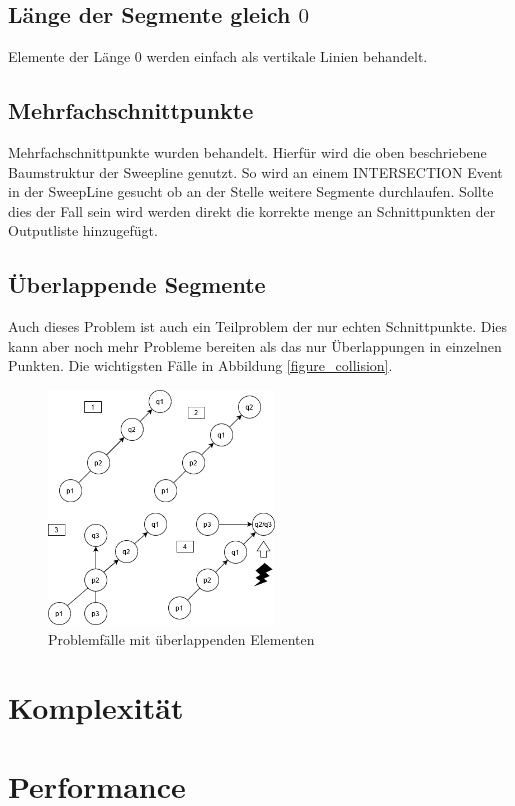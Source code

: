 \documentclass[conference]{IEEEtran}
\begin{document}
	\subsection{Länge der Segmente gleich $0$}
	Elemente der Länge 0 werden einfach als vertikale Linien behandelt.
	
	\subsection{Mehrfachschnittpunkte}
	Mehrfachschnittpunkte wurden behandelt. Hierfür wird die oben beschriebene Baumstruktur der Sweepline genutzt. So wird an einem INTERSECTION Event in der SweepLine gesucht ob an der Stelle weitere Segmente durchlaufen. Sollte dies der Fall sein wird werden direkt die korrekte menge an Schnittpunkten der Outputliste hinzugefügt.
	
	\subsection{Überlappende Segmente}
	Auch dieses Problem ist auch ein Teilproblem der nur echten Schnittpunkte. Dies kann aber noch mehr Probleme bereiten als das nur Überlappungen in einzelnen Punkten. Die wichtigsten Fälle in Abbildung \ref{figure_collision}.
	
	\begin{figure}[h]
		\begin{center}
			\includegraphics[width=6cm]{ProblemUberlappen.png}
			\caption{Problemfälle mit überlappenden Elementen}
			\label{figure_3}
		\end{center}
	\end{figure}
	
	\section{Komplexität}
	
	\section{Performance}
	
\end{document}
